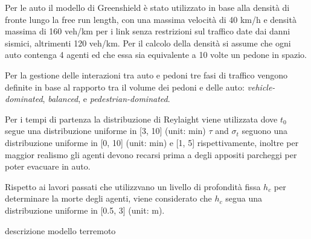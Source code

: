 Per le auto il modello di Greenshield è stato utilizzato in base alla densità di fronte lungo la free run length,
con una massima velocità di 40 km/h e densità massima di 160 veh/km per i link senza restrizioni sul traffico date dai danni sismici, altrimenti 120 veh/km.
Per il calcolo della densità si assume che ogni auto contenga 4 agenti ed che essa sia equivalente a 10 volte un pedone in spazio.

\vspace*{5mm}

Per la gestione delle interazioni tra auto e pedoni tre fasi di traffico vengono definite in base al rapporto
tra il volume dei pedoni e delle auto: \textit{vehicle-dominated}, \textit{balanced}, e \textit{pedestrian-dominated}.

\vspace*{5mm}

Per i tempi di partenza la distribuzione di Reylaight viene utilizzata dove $t_{0}$ segue una distribuzione uniforme in [3, 10] (unit: min)
$\tau$ and $\sigma_{t}$ seguono una distribuzione uniforme in [0, 10] (unit: min) e [1, 5] rispettivamente, 
inoltre per maggior realismo gli agenti devono recarsi prima a degli appositi parcheggi per poter evacuare in auto.

\vspace*{5mm}

Rispetto ai lavori passati che utilizzvano un livello di profondità fissa $h_c$ per determinare la morte degli agenti,
viene considerato che $h_c$ segua una distribuzione uniforme in [0.5, 3] (unit: m). 

\vspace*{5mm}

descrizione modello terremoto


\newpage
